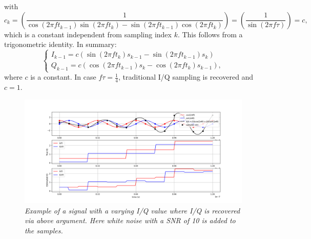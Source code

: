 \documentclass[12pt]{amsart}
\newcommand{\IM}{\mathbf{IQ}}
\newcommand{\R}{\mathbb{R}}
\begin{document}
with
\begin{equation}
	c_k 
	= 
	\left(\frac{1}{\cos\left(2\pi f t_{k-1} \right) \sin\left(2\pi f t_{k} \right) 
	- \sin\left(2\pi f  t_{k-1}\right) \cos\left(2\pi f t_{k}\right)  }
	\right)
	=
	\left(\frac{1}{ \sin\left(2\pi f\tau\right) }
	\right)
	=c,
	\label{eq.inv2x2b}
\end{equation}
which is a constant independent from sampling index $k$.
This follows from a trigonometric identity.
In summary:
\begin{equation}
	\begin{cases}
		I_{k-1} = c\left( \sin\left(2\pi f t_{k} \right) s_{k-1} - \sin\left(2\pi f  t_{k-1}\right) s_{k} \right) \\
		Q_{k-1} = c\left(\cos\left(2\pi f  t_{k-1} \right) s_{k}  - \cos\left(2\pi f t_{k} \right) s_{k-1} \right),
	\end{cases}
	\label{eq.iq2}
\end{equation}
where $c$ is a constant.
In case $f\tau=\frac{1}{4}$, traditional I/Q sampling is recovered and $c=1$.

\begin{figure}[htbp] %
   \centering
   \includegraphics[width=5in]{im/iq3.png} 
   \caption{\em Example of a signal with a varying I/Q value where I/Q is recovered via above argument.
   Here white noise with a SNR of 10 is added to the samples.}
   \label{fig:iq3}
\end{figure}

%


%
%
\end{document}
